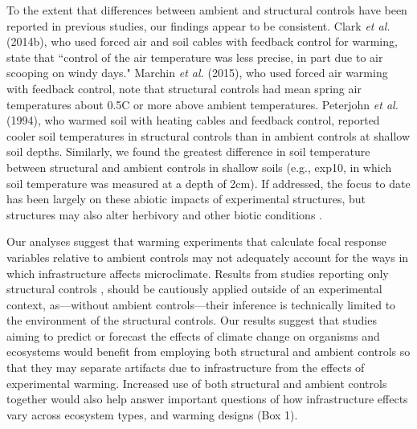 \documentclass{article}
\begin{document}
\par To the extent that differences between ambient and structural controls have been reported in previous studies, our findings appear to be consistent. Clark \textit{et al.} (2014b), who used forced air and soil cables with feedback control for warming, state that ``control of the air temperature was less precise, in part due to air scooping on windy days." Marchin \textit{et al.} (2015), who used forced air warming with feedback control, note that structural controls had mean spring air temperatures about 0.5\degree C or more above ambient temperatures. Peterjohn \textit{et al.} (1994), who warmed soil with heating cables and feedback control, reported cooler soil temperatures in structural controls than in ambient controls at shallow soil depths. Similarly, we found the greatest difference in soil temperature between structural and ambient controls in shallow soils (e.g., exp10, in which soil temperature was measured at a depth of 2cm). If addressed, the focus to date has been largely on these abiotic impacts of experimental structures, but structures may also alter herbivory and other biotic conditions \citep{kennedy1995,moise2010,wolkovich2012,hoeppner2012}. 

\par Our analyses suggest that warming experiments that calculate focal response variables relative to ambient controls \citep[e.g.,][]{price1998,dunne2003,cleland2006,morin2010,marchin2015} may not adequately account for the ways in which infrastructure affects microclimate. Results from studies reporting only structural controls \citep [e.g.,][]{sherry2007,hoeppner2012, rollinson2012}, should be cautiously applied outside of an experimental context, as---without ambient controls---their inference is technically limited to the environment of the structural controls. Our results suggest that studies aiming to predict or forecast the effects of climate change on organisms and ecosystems would benefit from employing both structural and ambient controls so that they may separate artifacts due to infrastructure from the effects of experimental warming. Increased use of both structural and ambient controls together would also help answer important questions of how infrastructure effects vary across ecosystem types, and warming designs (Box 1). 
\end{document}
